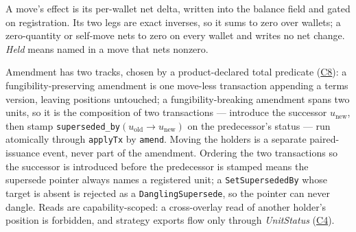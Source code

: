 \documentclass[11pt,a4paper]{article}
\begin{document}
A move's effect is its per-wallet net delta, written into the balance field and gated on
registration. Its two legs are exact inverses, so it sums to zero over wallets; a
zero-quantity or self-move nets to zero on every wallet and writes no net change.
\emph{Held} means named in a move that nets nonzero.

Amendment has two tracks, chosen by a product-declared total
predicate (\hyperref[cond:C8]{C8}): a fungibility-preserving amendment is one move-less
transaction appending a terms version, leaving positions untouched; a fungibility-breaking
amendment spans two units, so it is the composition of two transactions --- introduce the
successor $u_{\mathrm{new}}$, then stamp
\texttt{superseded\_by}$(u_{\mathrm{old}}\!\to u_{\mathrm{new}})$ on the predecessor's status
--- run atomically through \texttt{applyTx} by \texttt{amend}. Moving the holders is a
separate paired-issuance event, never part of the amendment. Ordering the two transactions so
the successor is introduced before the predecessor is stamped means the supersede pointer
always names a registered unit; a \texttt{SetSupersededBy} whose target is absent is rejected
as a \texttt{DanglingSupersede}, so the pointer can never dangle. Reads are capability-scoped: a
cross-overlay read of another holder's position is forbidden, and strategy exports flow only
through \emph{UnitStatus} (\hyperref[cond:C4]{C4}).
\end{document}
